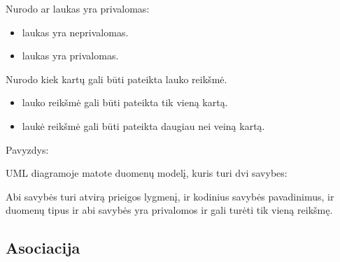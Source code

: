 \documentclass[letterpaper,10pt,lithuanian]{sphinxmanual}
\begin{document}
\begin{description}
\sphinxAtStartPar
Nurodo ar laukas yra privalomas:
\begin{itemize}
\item {} 
\sphinxAtStartPar
{} \sphinxhyphen{} laukas yra neprivalomas.

\item {} 
\sphinxAtStartPar
{} \sphinxhyphen{} laukas yra privalomas.

\end{itemize}

\sphinxAtStartPar
Nurodo kiek kartų gali būti pateikta lauko reikšmė.
\begin{itemize}
\item {} 
\sphinxAtStartPar
{} \sphinxhyphen{} lauko reikšmė gali būti pateikta tik vieną kartą.

\item {} 
\sphinxAtStartPar
\sphinxcode{\sphinxupquote{*}} \sphinxhyphen{} laukė reikšmė gali būti pateikta daugiau nei veiną kartą.

\end{itemize}

\end{description}

\sphinxAtStartPar
Pavyzdys:

\sphinxAtStartPar
UML diagramoje matote  duomenų modelį, kuris turi dvi savybes:

\begin{sphinxVerbatim}[commandchars=\\\{\}]
   \PYG{p}{[}\PYG{p}{]}
   \PYG{p}{[}\PYG{p}{]}
\end{sphinxVerbatim}

\sphinxAtStartPar
Abi savybės turi atvirą prieigos lygmenį,  ir  kodinius
savybės pavadinimus,  ir  duomenų tipus ir abi savybės yra
privalomos ir gali turėti tik vieną reikšmę.


\subsection{Asociacija}
\label{\detokenize{modelis:asociacija}}
\end{document}

